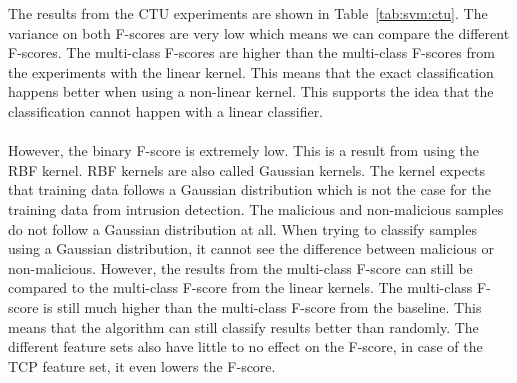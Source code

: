 \noindent The results from the CTU experiments are shown in Table~\ref{tab:svm:ctu}. The variance on both F-scores are very low which means we can compare the different F-scores. The multi-class F-scores are higher than the multi-class F-scores from the experiments with the linear kernel. This means that the exact classification happens better when using a non-linear kernel. This supports the idea that the classification cannot happen with a linear classifier. \\
\\
However, the binary F-score is extremely low. This is a result from using the RBF kernel. RBF kernels are also called Gaussian kernels. The kernel expects that training data follows a Gaussian distribution which is not the case for the training data from intrusion detection. The malicious and non-malicious samples do not follow a Gaussian distribution at all. When trying to classify samples using a Gaussian distribution, it cannot see the difference between malicious or non-malicious. However, the results from the multi-class F-score can still be compared to the multi-class F-score from the linear kernels. The multi-class F-score is still much higher than the multi-class F-score from the baseline. This means that the algorithm can still classify results better than randomly. The different feature sets also have little to no effect on the F-score, in case of the TCP feature set, it even lowers the F-score. 

